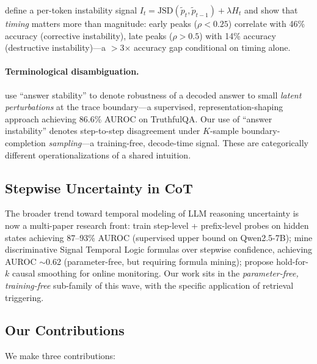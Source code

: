 \documentclass[11pt]{article}
\begin{document}
\cite{Chen_DynamicInstabilityLLMReasoning} define a per-token
instability signal $I_t = \text{JSD}(\tilde{p}_t,
\tilde{p}_{t-1}) + \lambda H_t$ and show that \emph{timing} matters
more than magnitude: early peaks ($\rho < 0.25$) correlate with 46\%
accuracy (corrective instability), late peaks ($\rho > 0.5$) with
14\% accuracy (destructive instability)---a $>$3$\times$ accuracy
gap conditional on timing alone.

\paragraph{Terminological disambiguation.}
\cite{Zhang_AnswerAgreementRepresentationShaping} use ``answer
stability'' to denote robustness of a decoded answer to small
\emph{latent perturbations} at the trace boundary---a supervised,
representation-shaping approach achieving 86.6\% AUROC on TruthfulQA.
Our use of ``answer instability'' denotes step-to-step disagreement
under $K$-sample boundary-completion \emph{sampling}---a
training-free, decode-time signal. These are categorically different
operationalizations of a shared intuition.


\subsection{Stepwise Uncertainty in CoT}

The broader trend toward temporal modeling of LLM reasoning
uncertainty is now a multi-paper research front:
\cite{Lu_StreamingHallucinationDetectionCoT} train step-level +
prefix-level probes on hidden states achieving 87--93\% AUROC
(supervised upper bound on Qwen2.5-7B);
\cite{Mao_ConfidenceOverTimeSTL} mine discriminative Signal Temporal
Logic formulas over stepwise confidence, achieving AUROC $\sim$0.62
(parameter-free, but requiring formula mining);
\cite{Datta_DecideEarlyExplainLater} propose hold-for-$k$ causal
smoothing for online monitoring.
Our work sits in the \emph{parameter-free, training-free} sub-family
of this wave, with the specific application of retrieval triggering.


\subsection{Our Contributions}

We make three contributions:
\end{document}
